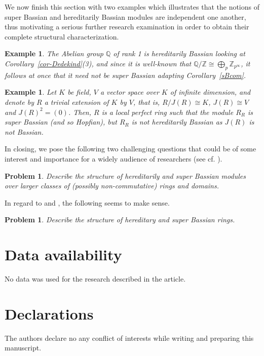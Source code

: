 \documentclass{amsart}
\newtheorem{exm}[thm]{Example}
\newtheorem{prob}[thm]{Problem}
\theoremstyle{definition}
\newcommand{\Z}{\mathbb{Z}}
\newcommand{\Q}{\mathbb{Q}}
\begin{document}
\medskip

We now finish this section with two examples which illustrates that the notions of super Bassian and hereditarily Bassian modules are independent one another, thus motivating a serious further research examination in order to obtain their complete structural characterization.

\begin{exm} The Abelian group $\Q$ of rank 1 is hereditarily Bassian looking at Corollary~\ref{cor-Dedekind}(3), and since it is well-known that $\Q/\Z\cong \bigoplus_p\Z_{p^\infty}$, it follows at once that it need not be super Bassian adapting Corollary~\ref{sBcom}.
\end{exm}

\begin{exm} Let $K$ be field, $V$ a vector space over $K$ of infinite dimension, and denote by $R$ a trivial extension of $K$ by $V$, that is, $R/J(R)\cong K$, $J(R)\cong V$ and $J(R)^2=(0)$. Then, $R$ is a local perfect ring such that the module $R_R$ is super Bassian (and so Hopfian), but $R_R$ is not hereditarily Bassian as $J(R)$ is not Bassian.
\end{exm}

In closing, we pose the following two challenging questions that could be of some interest and importance for a widely audience of researchers (see cf. \cite{K}).

\begin{prob} Describe the structure of hereditarily and super Bassian modules over larger classes of (possibly non-commutative) rings and domains.
\end{prob}

In regard to \cite{B} and \cite{RS}, the following seems to make sense.

\begin{prob} Describe the structure of hereditary and super Bassian rings.
\end{prob}

\medskip
\medskip

\section*{Data availability}
No data was used for the research described in the article.

\medskip
\medskip

\section*{Declarations}
The authors declare no any conflict of interests while writing and preparing this manuscript.
\end{document}
